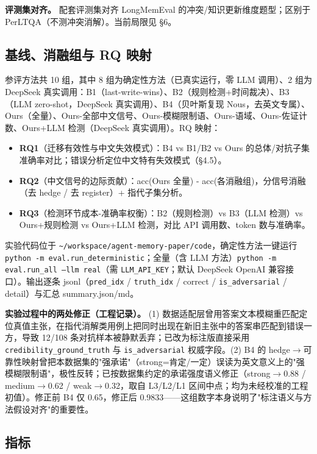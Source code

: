 \documentclass{article}
\begin{document}
\textbf{评测集对齐。} 配套评测集对齐 LongMemEval 的冲突/知识更新维度题型；区别于 PerLTQA（不测冲突消解）。当前局限见 §6。


\subsection{基线、消融组与 RQ 映射}

参评方法共 10 组，其中 8 组为确定性方法（已真实运行，零 LLM 调用）、2 组为 DeepSeek 真实调用：B1（last-write-wins）、B2（规则检测+时间裁决）、B3（LLM zero-shot，DeepSeek 真实调用）、B4（贝叶斯复现 Nous，去英文专属）、Ours（全量）、Ours-全部中文信号、Ours-模糊限制语、Ours-语域、Ours-佐证计数、Ours+LLM 检测（DeepSeek 真实调用）。RQ 映射：


\begin{itemize}
\item \textbf{RQ1}（迁移有效性与中文失效模式）：B4 vs B1/B2 vs Ours 的总体/对抗子集准确率对比；错误分析定位中文特有失效模式（§4.5）。
\item \textbf{RQ2}（中文信号的边际贡献）：acc(Ours 全量) - acc(各消融组)，分信号消融（去 hedge / 去 register）+ 指代子集分析。
\item \textbf{RQ3}（检测环节成本-准确率权衡）：B2（规则检测）vs B3（LLM 检测）vs Ours+规则检测 vs Ours+LLM 检测，对比 API 调用数、token 数与准确率。
\end{itemize}

实验代码位于 \texttt{\textasciitilde{}/workspace/agent-memory-paper/code}，确定性方法一键运行 \texttt{python -m eval.run\_deterministic}；全量（含 LLM 方法）\texttt{python -m eval.run\_all --llm real}（需 \texttt{LLM\_API\_KEY}；默认 DeepSeek OpenAI 兼容接口）。输出逐条 jsonl（\texttt{pred\_idx} / \texttt{truth\_idx} / correct / \texttt{is\_adversarial} / detail）与汇总 summary.json/md。


\textbf{实验过程中的两处修正（工程记录）。} (1) 数据适配层曾用答案文本模糊重匹配定位真值主张，在指代消解类用例上把同时出现在新旧主张中的答案串匹配到错误一方，导致 12/108 条对抗样本被静默丢弃；已改为标注版直接采用 \texttt{credibility\_ground\_truth} 与 \texttt{is\_adversarial} 权威字段。(2) B4 的 hedge$\to$可靠性映射曾把本数据集的"强承诺"（strong=肯定/一定）误读为英文意义上的"强模糊限制语"，极性反转；已按数据集约定的承诺强度语义修正（strong$\to$0.88 / medium$\to$0.62 / weak$\to$0.32，取自 L3/L2/L1 区间中点；均为未经校准的工程初值）。修正前 B4 仅 0.65，修正后 0.9833——这组数字本身说明了"标注语义与方法假设对齐"的重要性。


\subsection{指标}
\end{document}
